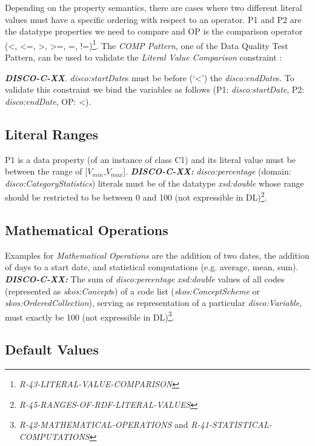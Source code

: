 \documentclass{llncs}
\begin{document}
Depending on the property semantics,
there are cases where two different literal values must have
a specific ordering with respect to an operator. 
P1 and P2 are the datatype properties we need to compare and 
OP is the comparison operator (\textless, \textless=, \textgreater, \textgreater=, =, !=)\footnote{{\em R-43-LITERAL-VALUE-COMPARISON}}.
The {\em COMP Pattern}, one of the Data Quality Test Pattern, can be used to validate the {\em Literal Value Comparison} constraint \cite{Kontokostas2014}:


\textbf{{\em DISCO-C-XX}}.
{\em disco:startDate}s must be before (‘\textless’) the {\em disco:endDate}s.
To validate this constraint we bind the variables as follows (P1: {\em disco:startDate}, P2: {\em disco:endDate}, OP: \textless). 

\subsection{Literal Ranges}

P1 is a data property (of an instance of class C1) and its literal value must be between the range of [$V_{min}$,$V_{max}$].
\textbf{{\em DISCO-C-XX:}}
{\em disco:percentage} (domain: {\em disco:CategoryStatistics}) literals must be of the datatype {\em xsd:double} whose range should be restricted to be between 0 and 100 (not expressible in DL)\footnote{{\em R-45-RANGES-OF-RDF-LITERAL-VALUES}}.

\subsection{Mathematical Operations}

Examples for {\em Mathematical Operations} are the addition of two dates, the addition of days to a start date, and statistical computations (e.g. average, mean, sum).
\textbf{{\em DISCO-C-XX:}}
The sum of {\em disco:percentage} {\em xsd:double} values of all codes (represented as {\em skos:Concept}s) of a code list ({\em skos:ConceptScheme} or {\em skos:OrderedCollection}), serving as representation of a particular {\em disco:Variable}, must exactly be 100  
(not expressible in DL)\footnote{{\em R-42-MATHEMATICAL-OPERATIONS} and {\em R-41-STATISTICAL-COMPUTATIONS}}.

\subsection{Default Values}
\end{document}
